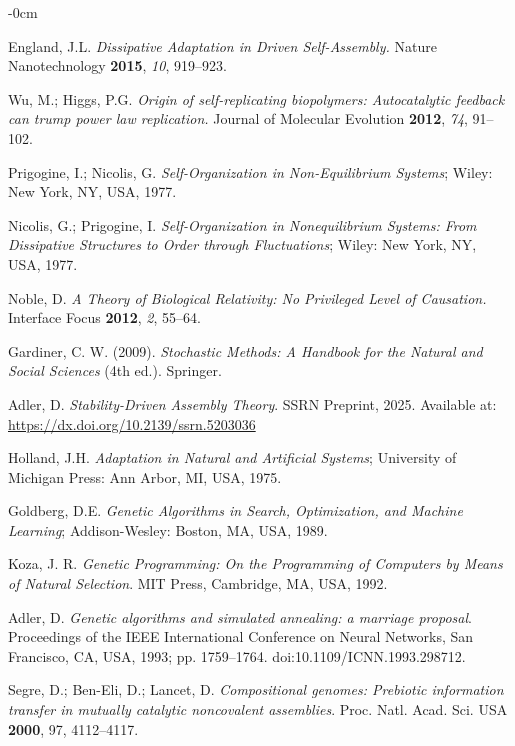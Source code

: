 \documentclass[life,article,submit,pdftex,moreauthors]{Definitions/mdpi}
\begin{document}
\begin{adjustwidth}{-\extralength}{0cm}
{\begin{thebibliography}{999}
England, J.L. \textit{Dissipative Adaptation in Driven Self-Assembly.} Nature Nanotechnology \textbf{2015}, \textit{10}, 919–923.

Wu, M.; Higgs, P.G. \textit{Origin of self-replicating biopolymers: Autocatalytic feedback can trump power law replication.} Journal of Molecular Evolution \textbf{2012}, \textit{74}, 91–102.

Prigogine, I.; Nicolis, G. \textit{Self-Organization in Non-Equilibrium Systems}; Wiley: New York, NY, USA, 1977.

Nicolis, G.; Prigogine, I. \textit{Self-Organization in Nonequilibrium Systems: From Dissipative Structures to Order through Fluctuations}; Wiley: New York, NY, USA, 1977.

Noble, D. \textit{A Theory of Biological Relativity: No Privileged Level of Causation.} Interface Focus \textbf{2012}, \textit{2}, 55–64.

 Gardiner, C. W. (2009). \textit{Stochastic Methods: A Handbook for the Natural and Social Sciences} (4th ed.). Springer.

Adler, D.
\textit{Stability-Driven Assembly Theory}.
SSRN Preprint, 2025. Available at: \url{https://dx.doi.org/10.2139/ssrn.5203036}

Holland, J.H. \textit{Adaptation in Natural and Artificial Systems}; University of Michigan Press: Ann Arbor, MI, USA, 1975.

Goldberg, D.E. \textit{Genetic Algorithms in Search, Optimization, and Machine Learning}; Addison-Wesley: Boston, MA, USA, 1989.

Koza, J. R.
\textit{Genetic Programming: On the Programming of Computers by Means of Natural Selection}.
MIT Press, Cambridge, MA, USA, 1992.

Adler, D. \textit{Genetic algorithms and simulated annealing: a marriage proposal}. Proceedings of the IEEE International Conference on Neural Networks, San Francisco, CA, USA, 1993; pp. 1759--1764. doi:10.1109/ICNN.1993.298712.

Segre, D.; Ben-Eli, D.; Lancet, D. \textit{Compositional genomes: Prebiotic information transfer in mutually catalytic noncovalent assemblies}. Proc. Natl. Acad. Sci. USA \textbf{2000}, 97, 4112--4117.


\end{thebibliography}}
\end{adjustwidth}
\end{document}
